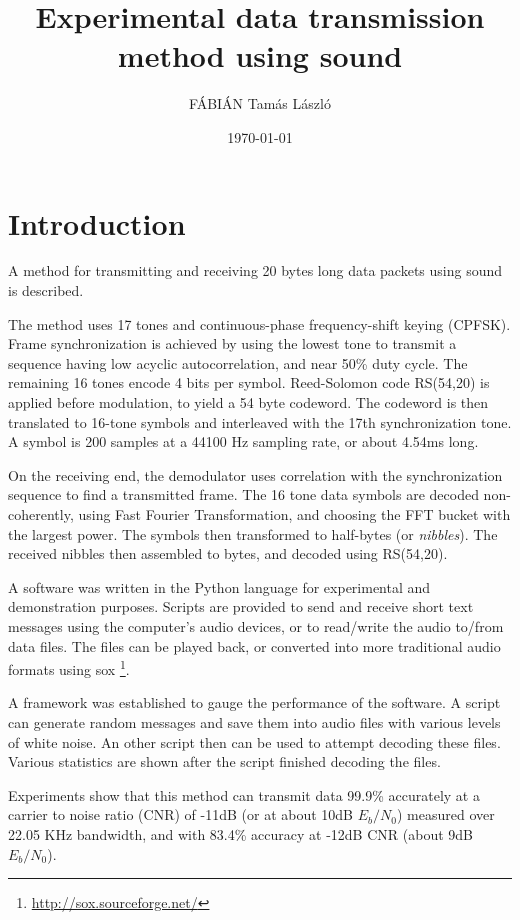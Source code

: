 \documentclass[a4paper]{article}
\title{Experimental data transmission method using sound}
\author{FÁBIÁN Tamás László}
\date{\today}
\begin{document}
\maketitle

\section{Introduction}

A method for transmitting and receiving 20 bytes long data packets 
using sound is described.

The method uses 17 tones and continuous-phase frequency-shift keying 
(CPFSK). Frame synchronization is achieved by using the lowest tone to 
transmit a sequence having low acyclic autocorrelation, and near 50\% 
duty cycle. The remaining 16 tones encode 4 bits per symbol. 
Reed-Solomon code RS(54,20) is applied before modulation, to yield a 54 
byte codeword. The codeword is then translated to 16-tone symbols and 
interleaved with the 17th synchronization tone. A symbol is 200 samples
at a 44100 Hz sampling rate, or about 4.54ms long.

On the receiving end, the demodulator uses correlation with the 
synchronization sequence to find a transmitted frame. The 16 tone data 
symbols are decoded non-coherently, using Fast Fourier Transformation, 
and choosing the FFT bucket with the largest power. The symbols then 
transformed to half-bytes (or \emph{nibbles}). The received nibbles 
then assembled to bytes, and decoded using RS(54,20).

A software was written in the Python language for experimental and 
demonstration purposes. Scripts are provided to send and receive short 
text messages using the computer's audio devices, or to read/write the 
audio to/from data files. The files can be played back, or converted 
into more traditional audio formats using sox 
\footnote{\url{http://sox.sourceforge.net/}}.

A framework was established to gauge the performance of the software. A 
script can generate random messages and save them into audio files with 
various levels of white noise. An other script then can be used to 
attempt decoding these files. Various statistics are shown after the 
script finished decoding the files.

Experiments show that this method can transmit data 99.9\% accurately 
at a carrier to noise ratio (CNR) of -11dB (or at about 10dB 
$E_b/N_0$) measured over 22.05 KHz bandwidth, and with 83.4\% accuracy 
at -12dB CNR (about 9dB $E_b/N_0$).
\end{document}
